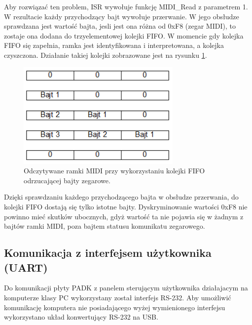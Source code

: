 Aby rozwiązać ten problem, ISR wywołuje funkcję MIDI\_Read z parametrem 1. W rezultacie każdy przychodzący bajt wywołuje przerwanie. W jego obsłudze sprawdzana jest wartość bajta, jesli jest ona różna od 0xF8 (zegar MIDI), to zostaje ona dodana do trzyelementowej kolejki FIFO. W momencie gdy kolejka FIFO się zapełnia, ramka jest identyfikowana i interpretowana, a kolejka czyszczona. Działanie takiej kolejki zobrazowane jest na rysunku \ref{rys:real_fifo}.
\begin{figure}[H]
	\centering
	\includegraphics[width=8cm]{./grafiki/real_fifo}
	\captionsetup{justification=centering}
	\caption{Odczytywane ramki MIDI przy wykorzystaniu kolejki FIFO odrzucającej bajty zegarowe.}
	\label{rys:real_fifo}
\end{figure} 
Dzięki sprawdzaniu każdego przychodzącego bajta w obsłudze przerwania, do kolejki FIFO dostają się tylko istotne bajty. Dyskryminowanie wartości 0xF8 nie powinno mieć skutków ubocznych, gdyż wartość ta nie pojawia się w żadnym z bajtów ramki MIDI, poza bajtem statusu komunikatu zegarowego.

\subsection{Komunikacja z interfejsem użytkownika (UART)}\label{sec:real_komunikacja}
Do komunikacji płyty PADK z panelem sterującym użytkownika działajacym na komputerze klasy PC wykorzystany został interfejs RS-232. Aby umożliwić komunikację komputera nie posiadającego wyżej wymienionego interfejsu wykorzystano układ konwertujący RS-232 na USB.

